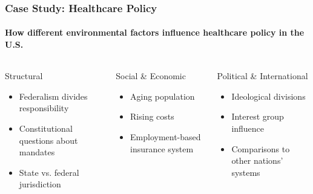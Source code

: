 \documentclass[10pt]{beamer}
\begin{document}
\begin{frame}
\frametitle{Case Study: Healthcare Policy}
\framesubtitle{How different environmental factors influence healthcare policy in the U.S.}

\begin{columns}
\begin{column}{0.32\textwidth}
\begin{block}{Structural}
\begin{itemize}
\item Federalism divides responsibility
\item Constitutional questions about mandates
\item State vs. federal jurisdiction
\end{itemize}
\end{block}
\end{column}

\begin{column}{0.32\textwidth}
\begin{block}{Social \& Economic}
\begin{itemize}
\item Aging population
\item Rising costs
\item Employment-based insurance system
\end{itemize}
\end{block}
\end{column}

\begin{column}{0.32\textwidth}
\begin{block}{Political \& International}
\begin{itemize}
\item Ideological divisions
\item Interest group influence
\item Comparisons to other nations' systems
\end{itemize}
\end{block}
\end{column}
\end{columns}

\end{frame}
\end{document}
